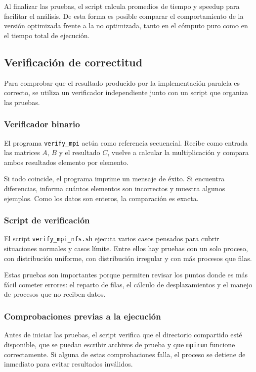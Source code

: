 Al finalizar las pruebas, el script calcula promedios de tiempo y speedup para facilitar el análisis. De esta forma es posible comparar el comportamiento de la versión optimizada frente a la no optimizada, tanto en el cómputo puro como en el tiempo total de ejecución.

\subsection{Verificación de correctitud}

Para comprobar que el resultado producido por la implementación paralela es correcto, se utiliza un verificador independiente junto con un script que organiza las pruebas.

\subsubsection{Verificador binario}

El programa \texttt{verify\_mpi} actúa como referencia secuencial. Recibe como entrada las matrices \(A\), \(B\) y el resultado \(C\), vuelve a calcular la multiplicación y compara ambos resultados elemento por elemento.

Si todo coincide, el programa imprime un mensaje de éxito. Si encuentra diferencias, informa cuántos elementos son incorrectos y muestra algunos ejemplos. Como los datos son enteros, la comparación es exacta.

\subsubsection{Script de verificación}

El script \texttt{verify\_mpi\_nfs.sh} ejecuta varios casos pensados para cubrir situaciones normales y casos límite. Entre ellos hay pruebas con un solo proceso, con distribución uniforme, con distribución irregular y con más procesos que filas.

Estas pruebas son importantes porque permiten revisar los puntos donde es más fácil cometer errores: el reparto de filas, el cálculo de desplazamientos y el manejo de procesos que no reciben datos.

\subsubsection{Comprobaciones previas a la ejecución}

Antes de iniciar las pruebas, el script verifica que el directorio compartido esté disponible, que se puedan escribir archivos de prueba y que \texttt{mpirun} funcione correctamente. Si alguna de estas comprobaciones falla, el proceso se detiene de inmediato para evitar resultados inválidos.

